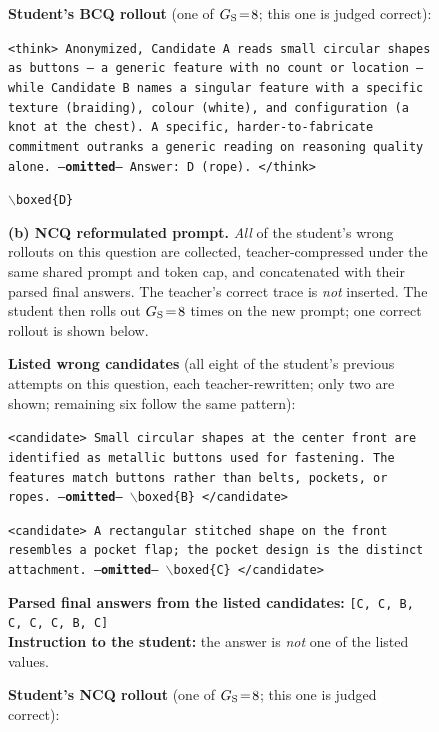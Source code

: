 \begin{figure}[!p]
\begin{prompttemplatefig}
\textbf{Student's BCQ rollout} (one of $G_{\rm S}\!=\!8$; this one is judged correct):

\smallskip
\texttt{<think> Anonymized, Candidate~A reads small circular shapes as buttons -- a generic feature with no count or location -- while Candidate~B names a singular feature with a specific texture (braiding), colour (white), and configuration (a knot at the chest). A specific, harder-to-fabricate commitment outranks a generic reading on reasoning quality alone. ---\textbf{omitted}--- Answer: D (rope). </think>}

\smallskip
\texttt{$\backslash$boxed\{D\}} \quad \textcolor{posgain}{\checkmark}
\end{prompttemplatefig}

\vspace{1pt}\noindent\textbf{(b) NCQ reformulated prompt.} \emph{All} of the student's wrong rollouts on this question are collected, teacher-compressed under the same shared prompt and token cap, and concatenated with their parsed final answers. The teacher's correct trace is \emph{not} inserted. The student then rolls out $G_{\rm S}\!=\!8$ times on the new prompt; one correct rollout is shown below.

\begin{negcandidatebox}
\textbf{Listed wrong candidates} (all eight of the student's previous attempts on this question, each teacher-rewritten; only two are shown; remaining six follow the same pattern):

\smallskip
\texttt{<candidate> Small circular shapes at the center front are identified as metallic buttons used for fastening. The features match buttons rather than belts, pockets, or ropes. ---\textbf{omitted}--- $\backslash$boxed\{B\} </candidate>}

\smallskip
\texttt{<candidate> A rectangular stitched shape on the front resembles a pocket flap; the pocket design is the distinct attachment. ---\textbf{omitted}--- $\backslash$boxed\{C\} </candidate>}

\smallskip
\textbf{Parsed final answers from the listed candidates:} \texttt{[C, C, B, C, C, C, B, C]} \\
\textbf{Instruction to the student:} the answer is \emph{not} one of the listed values.
\end{negcandidatebox}

\begin{prompttemplatefig}
\textbf{Student's NCQ rollout} (one of $G_{\rm S}\!=\!8$; this one is judged correct):


\end{prompttemplatefig}
\end{figure}
